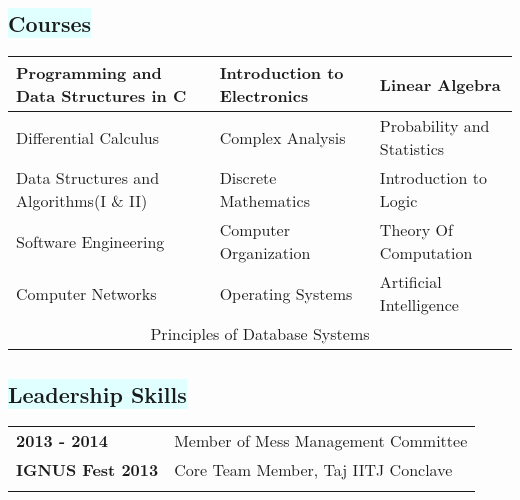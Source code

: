 \documentclass[a4paper,10pt]{extarticle}
\begin{document}
\begin{mybox}
\begin{tabular}[H]{|>{\raggedleft\arraybackslash}p{5cm}|p{12.5cm}|}
\end{tabular}
\subsection*{\colorbox{LightCyan}{\setmainfont{Calibri Bold.ttf}\textbf{Courses}}}
\begin{tabular}[H]{|p{6cm}|p{5cm}|p{6cm}|}
\hline
Programming and Data Structures in C &	Introduction to Electronics &	Linear Algebra \\ \hline
Differential Calculus &	Complex Analysis &	Probability and Statistics \\ \hline
Data Structures and Algorithms(I \& II)	& Discrete Mathematics &	Introduction to Logic \\ \hline
Software Engineering &	Computer Organization &	Theory Of Computation \\  \hline
Computer Networks & Operating Systems & Artificial Intelligence \\ \hline
\multicolumn{3}{|c|}{Principles of Database Systems} \\
\hline
\end{tabular}
\subsection*{\colorbox{LightCyan}{\setmainfont{Calibri Bold.ttf}\textbf{Leadership Skills}}}
\begingroup
\begin{tabular}[H]{|p{3.5cm}|p{14cm}|}
\hhline{|-|-|}
\setmainfont{Calibri Bold.ttf}\textbf{2013 - 2014}	& Member of Mess Management Committee  \tabularnewline \hhline{|-|-|}
\setmainfont{Calibri Bold.ttf}\textbf{IGNUS Fest 2013}	& Core Team Member, Taj IITJ Conclave  \tabularnewline \hhline{|-|-|}
\end{tabular}
\endgroup

\end{mybox}
\end{document}
